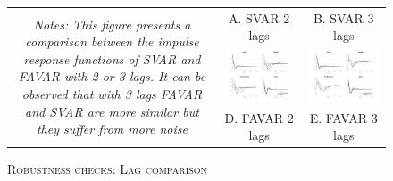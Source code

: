 \documentclass[11pt,a4paper]{article}
\begin{document}
	
	

\newpage

\begin{landscape}
	\begin{figure}[H]
		\begin{center}
			\caption{\textsc{Robustness checks: Lag comparison}}
			\label{fig:robustness_lags}
			\begin{tabular}{ccc}
			\multirow{ 4}{6cm}{
			\emph{Notes:  
				This figure presents a comparison between the impulse response functions of SVAR and FAVAR with 2 or 3 lags.
				It can be observed that with 3 lags FAVAR and SVAR are more similar but they suffer from more noise		}
			} &
				A. SVAR 2 lags & B. SVAR 3 lags  \\
				&\includegraphics[width=9cm]{Figures/rob_SVAR_2} &  \includegraphics[width=9cm]{Figures/rob_SVAR_3} \\
				&D. FAVAR 2 lags  & E. FAVAR 3 lags  \\

\end{tabular}
\end{center}
\end{figure}
\end{landscape}
\end{document}
